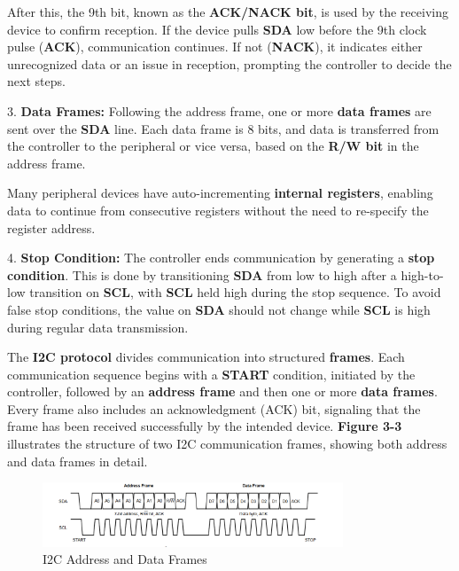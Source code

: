 \documentclass[a4paper,12pt]{report}
\begin{document}
   \vspace{0.25in}

   After this, the 9th bit, known as the \textbf{ACK/NACK bit}, is used by the receiving device to confirm reception. If the device pulls \textbf{SDA} low before the 9th clock pulse (\textbf{ACK}), communication continues. If not (\textbf{NACK}), it indicates either unrecognized data or an issue in reception, prompting the controller to decide the next steps.

\vspace{0.25in}

3. \textbf{Data Frames:}  
   Following the address frame, one or more \textbf{data frames} are sent over the \textbf{SDA} line. Each data frame is 8 bits, and data is transferred from the controller to the peripheral or vice versa, based on the \textbf{R/W bit} in the address frame.
   
   \vspace{0.25in}

   Many peripheral devices have auto-incrementing \textbf{internal registers}, enabling data to continue from consecutive registers without the need to re-specify the register address.

\vspace{0.25in}

4. \textbf{Stop Condition:}  
   The controller ends communication by generating a \textbf{stop condition}. This is done by transitioning \textbf{SDA} from low to high after a high-to-low transition on \textbf{SCL}, with \textbf{SCL} held high during the stop sequence. To avoid false stop conditions, the value on \textbf{SDA} should not change while \textbf{SCL} is high during regular data transmission.

The \textbf{I2C protocol} divides communication into structured \textbf{frames}. Each communication sequence begins with a \textbf{START} condition, initiated by the controller, followed by an \textbf{address frame} and then one or more \textbf{data frames}. Every frame also includes an acknowledgment (ACK) bit, signaling that the frame has been received successfully by the intended device. \textbf{Figure 3-3} illustrates the structure of two I2C communication frames, showing both address and data frames in detail.

\begin{figure}[htbp]
    \centering
    \includegraphics[width=0.8\textwidth]{i2c_frames.png} %
    \caption{I2C Address and Data Frames}
    \label{fig:i2c_frames}
\end{figure}
\end{document}

